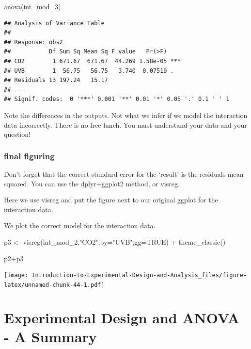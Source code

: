 \documentclass[
]{book}
\newenvironment{Shaded}{\begin{snugshade}}{\end{snugshade}}
\newcommand{\AttributeTok}[1]{\textcolor[rgb]{0.77,0.63,0.00}{#1}}
\newcommand{\ConstantTok}[1]{\textcolor[rgb]{0.00,0.00,0.00}{#1}}
\newcommand{\FunctionTok}[1]{\textcolor[rgb]{0.00,0.00,0.00}{#1}}
\newcommand{\NormalTok}[1]{#1}
\newcommand{\OtherTok}[1]{\textcolor[rgb]{0.56,0.35,0.01}{#1}}
\newcommand{\SpecialCharTok}[1]{\textcolor[rgb]{0.00,0.00,0.00}{#1}}
\newcommand{\StringTok}[1]{\textcolor[rgb]{0.31,0.60,0.02}{#1}}
\begin{document}
\begin{Shaded}
\begin{Highlighting}[]
\FunctionTok{anova}\NormalTok{(int\_mod\_3)}
\end{Highlighting}
\end{Shaded}

\begin{verbatim}
## Analysis of Variance Table
## 
## Response: obs2
##           Df Sum Sq Mean Sq F value   Pr(>F)    
## CO2        1 671.67  671.67  44.269 1.58e-05 ***
## UVB        1  56.75   56.75   3.740  0.07519 .  
## Residuals 13 197.24   15.17                     
## ---
## Signif. codes:  0 '***' 0.001 '**' 0.01 '*' 0.05 '.' 0.1 ' ' 1
\end{verbatim}

Note the differences in the outputs. Not what we infer if we model the interaction data incorrectly. There is no free lunch. You must understand your data and your question!

\hypertarget{final-figuring}{%
\subsection{final figuring}\label{final-figuring}}

Don't forget that the correct standard error for the `result' is the residuals mean squared. You can use the dplyr+ggplot2 method, or visreg.

Here we use visreg and put the figure next to our original ggplot for the interaction data.

We plot the correct model for the interaction data.

\begin{Shaded}
\begin{Highlighting}[]
\NormalTok{p3 }\OtherTok{\textless{}{-}} \FunctionTok{visreg}\NormalTok{(int\_mod\_2,}\StringTok{"CO2"}\NormalTok{,}\AttributeTok{by=}\StringTok{"UVB"}\NormalTok{,}\AttributeTok{gg=}\ConstantTok{TRUE}\NormalTok{) }\SpecialCharTok{+}
  \FunctionTok{theme\_classic}\NormalTok{()}

\NormalTok{p2}\SpecialCharTok{+}\NormalTok{p3}
\end{Highlighting}
\end{Shaded}

\texttt{[image: Introduction-to-Experimental-Design-and-Analysis\_files/figure-latex/unnamed-chunk-44-1.pdf]}

\hypertarget{experimental-design-and-anova---a-summary}{%
\chapter{Experimental Design and ANOVA - A Summary}\label{experimental-design-and-anova---a-summary}}
\end{document}
